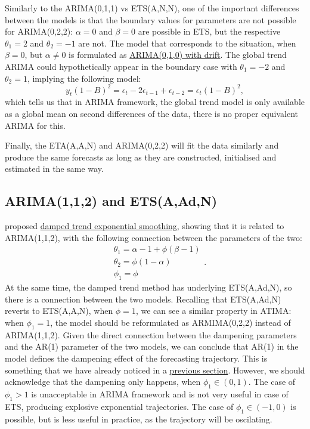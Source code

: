 \documentclass[
]{book}
\theoremstyle{definition}
\theoremstyle{definition}
\theoremstyle{definition}
\theoremstyle{definition}
\theoremstyle{remark}
\begin{document}
Similarly to the ARIMA(0,1,1) vs ETS(A,N,N), one of the important differences between the models is that the boundary values for parameters are not possible for ARIMA(0,2,2): \(\alpha=0\) and \(\beta=0\) are possible in ETS, but the respective \(\theta_1=2\) and \(\theta_2=-1\) are not. The model that corresponds to the situation, when \(\beta=0\), but \(\alpha \neq 0\) is formulated as \protect\hyperlink{Differences}{ARIMA(0,1,0) with drift}. The global trend ARIMA could hypothetically appear in the boundary case with \(\theta_1=-2\) and \(\theta_2=1\), implying the following model:
\begin{equation*}
    y_t (1 - B)^2 = \epsilon_t - 2\epsilon_{t-1} + \epsilon_{t-2} = \epsilon_t (1 - B)^2 ,
\end{equation*}
which tells us that in ARIMA framework, the global trend model is only available as a global mean on second differences of the data, there is no proper equivalent ARIMA for this.

Finally, the ETA(A,A,N) and ARIMA(0,2,2) will fit the data similarly and produce the same forecasts as long as they are constructed, initialised and estimated in the same way.

\hypertarget{ARIMAETS112}{%
\subsection{ARIMA(1,1,2) and ETS(A,Ad,N)}\label{ARIMAETS112}}

\citet{Roberts1982} proposed \protect\hyperlink{ETSAAdN}{damped trend exponential smoothing}, showing that it is related to ARIMA(1,1,2), with the following connection between the parameters of the two:
\begin{equation*}
  \begin{aligned}
    &\theta_1 = \alpha - 1 + \phi (\beta - 1) \\
    &\theta_2 = \phi(1-\alpha) \\
    &\phi_1 = \phi
  \end{aligned} .
\end{equation*}
At the same time, the damped trend method has underlying ETS(A,Ad,N), so there is a connection between the two models. Recalling that ETS(A,Ad,N) reverts to ETS(A,A,N), when \(\phi=1\), we can see a similar property in ATIMA: when \(\phi_1=1\), the model should be reformulated as ARMIMA(0,2,2) instead of ARIMA(1,1,2). Given the direct connection between the dampening parameters and the AR(1) parameter of the two models, we can conclude that AR(1) in the model defines the dampening effect of the forecasting trajectory. This is something that we have already noticed in a \protect\hyperlink{ARMAConstant}{previous section}. However, we should acknowledge that the dampening only happens, when \(\phi_1 \in (0,1)\). The case of \(\phi_1>1\) is unacceptable in ARIMA framework and is not very useful in case of ETS, producing explosive exponential trajectories. The case of \(\phi_1 \in (-1, 0)\) is possible, but is less useful in practice, as the trajectory will be oscilating.
\end{document}
